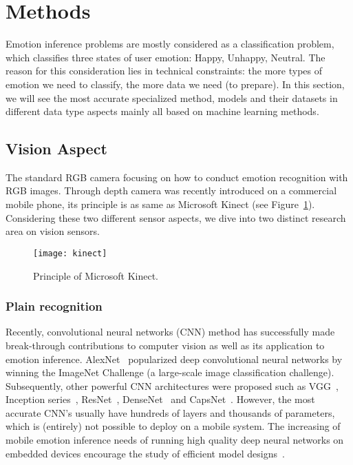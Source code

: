 \section{Methods}\label{sec:methods}

Emotion inference problems are mostly considered as a classification problem, which classifies three states of user emotion: Happy, Unhappy, Neutral. The reason for this consideration lies in technical constraints: the more types of emotion we need to classify, the more data we need (to prepare).
In this section, we will see the most accurate specialized method, models and their datasets in different data type aspects mainly all based on machine learning methods.

\subsection{Vision Aspect} \label{subsec:vision-model}

The standard RGB camera focusing on how to conduct emotion recognition with RGB images. Through depth camera was recently introduced on a commercial mobile phone, its principle is as same as Microsoft Kinect (see Figure~\ref{fig:kinect}). Considering these two different sensor aspects, we dive into two distinct research area on vision sensors.

\begin{figure}
  \centering
  \texttt{[image: kinect]}
  \caption{Principle of Microsoft Kinect.}
  \label{fig:kinect}
\end{figure}

\subsubsection{Plain recognition}

Recently, convolutional neural networks (CNN) method has successfully made break-through contributions to computer vision as well as its application to emotion inference. 
AlexNet~\cite{Krizhevsky2012} popularized deep convolutional neural networks by winning the ImageNet Challenge (a large-scale image classification challenge). Subsequently, other powerful CNN architectures were proposed such as VGG~\cite{Simonyan2015}, Inception series~\cite{Szegedy2014, Szegedy2015, Szegedy2016}, ResNet~\cite{He2016}, DenseNet~\cite{iandola2014densenet} and CapsNet~\cite{sabour2017dynamic}. However, the most accurate CNN's usually have hundreds of
layers and thousands of parameters, which is (entirely) not possible to deploy on a mobile system. The increasing of mobile emotion inference needs of running high quality deep neural networks on embedded devices encourage the study of efficient model designs~\cite{he2015convolutional}. 

